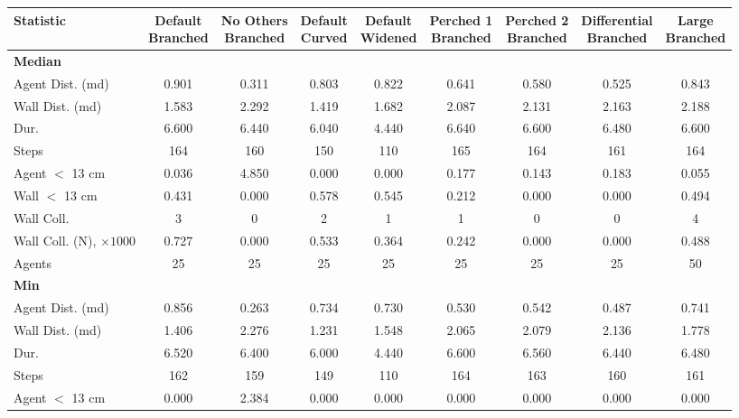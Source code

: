 \documentclass[a4paper, 11pt]{article}
\begin{document}
\begin{table}[htbp]
    \centering
    \label{tab:summary_statistics}
\setlength{\tabcolsep}{0pt}
\begin{tabular}{lcccccccc}
\toprule
Statistic & \makecell{Default\\Branched} & \makecell{No Others\\Branched} & \makecell{Default\\Curved} & \makecell{Default\\Widened} & \makecell{Perched 1\\Branched} & \makecell{Perched 2\\Branched} & \makecell{Differential\\Branched} & \makecell{Large\\Branched} \\
\midrule
\multicolumn{9}{l}{\textbf{Median}} \\
Agent Dist. (md) & 0.901 & 0.311 & 0.803 & 0.822 & 0.641 & 0.580 & 0.525 & 0.843 \\
Wall Dist. (md) & 1.583 & 2.292 & 1.419 & 1.682 & 2.087 & 2.131 & 2.163 & 2.188 \\
Dur. & 6.600 & 6.440 & 6.040 & 4.440 & 6.640 & 6.600 & 6.480 & 6.600 \\
Steps & 164 & 160 & 150 & 110 & 165 & 164 & 161 & 164 \\
Agent $<$ 13 cm & 0.036 & 4.850 & 0.000 & 0.000 & 0.177 & 0.143 & 0.183 & 0.055 \\
Wall $<$ 13 cm & 0.431 & 0.000 & 0.578 & 0.545 & 0.212 & 0.000 & 0.000 & 0.494 \\
Wall Coll. & 3 & 0 & 2 & 1 & 1 & 0 & 0 & 4 \\
Wall Coll. (N), $\times 1000$ & 0.727 & 0.000 & 0.533 & 0.364 & 0.242 & 0.000 & 0.000 & 0.488 \\
Agents & 25 & 25 & 25 & 25 & 25 & 25 & 25 & 50 \\
\midrule
\multicolumn{9}{l}{\textbf{Min}} \\
Agent Dist. (md) & 0.856 & 0.263 & 0.734 & 0.730 & 0.530 & 0.542 & 0.487 & 0.741 \\
Wall Dist. (md) & 1.406 & 2.276 & 1.231 & 1.548 & 2.065 & 2.079 & 2.136 & 1.778 \\
Dur. & 6.520 & 6.400 & 6.000 & 4.440 & 6.600 & 6.560 & 6.440 & 6.480 \\
Steps & 162 & 159 & 149 & 110 & 164 & 163 & 160 & 161 \\
Agent $<$ 13 cm & 0.000 & 2.384 & 0.000 & 0.000 & 0.000 & 0.000 & 0.000 & 0.000 \\

\end{tabular}
\end{table}
\end{document}
